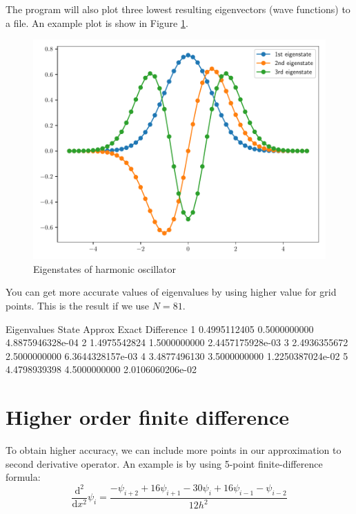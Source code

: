 The program will also plot three lowest resulting eigenvectors (wave functions) to a file.
An example plot is show in Figure \ref{fig:wfn_harm_01_51}.

\begin{figure}[h]
{\center
\includegraphics[width=\textwidth]{../codes/sch_1d/IMG_main_harmonic_01_51.pdf}
\par}
\caption{Eigenstates of harmonic oscillator}
\label{fig:wfn_harm_01_51}
\end{figure}

You can get more accurate values of eigenvalues by using higher value for grid points.
This is the result if we use $N=81$.
\begin{fullwidth}
\begin{textcode}
Eigenvalues
State         Approx              Exact          Difference
   1       0.4995112405       0.5000000000   4.8875946328e-04
   2       1.4975542824       1.5000000000   2.4457175928e-03
   3       2.4936355672       2.5000000000   6.3644328157e-03
   4       3.4877496130       3.5000000000   1.2250387024e-02
   5       4.4798939398       4.5000000000   2.0106060206e-02 
\end{textcode}
\end{fullwidth}

\section{Higher order finite difference}

To obtain higher accuracy, we can include more points in our approximation to second
derivative operator. An example is by using 5-point finite-difference formula:
\begin{equation}
\frac{\mathrm{d}^2}{\mathrm{d}x^2} \psi_{i} =
\frac{-\psi_{i+2} + 16\psi_{i+1} - 30\psi_{i} + 16\psi_{i-1} - \psi_{i-2}}{12h^2}
\label{eq:fd_2nd_deriv_5pt}
\end{equation}

